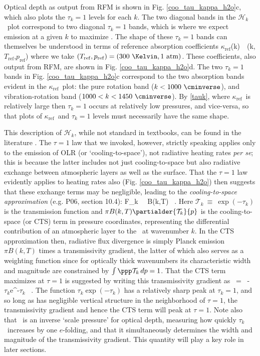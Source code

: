 \documentclass[10pt]{article}
\newcommand{\trans}{\ensuremath{\mathcal{T}}}
\newcommand{\ch}{\ensuremath{\mathcal{H}}}
\newcommand{\chk}{\ensuremath{\ch_k}}
\newcommand{\tauk}{\ensuremath{\tau_k}}
\newcommand{\kapparef}{\ensuremath{\kappa_{\mathrm{ref}}}}
\newcommand{\Tref}{\ensuremath{T_{\mathrm{ref}}}}
\newcommand{\pref}{\ensuremath{p_{\mathrm{ref}}}}
\begin{document}
 Optical depth as output from RFM is shown in Fig. \ref{coo_tau_kappa_h2o}c, which also plots the $\tauk=1$ levels for each $k$. The two diagonal bands in the \chk\ plot correspond to two diagonal $\tauk=1$ bands, which is where we expect emission at a given $k$ to maximize \citep[e.g.][hereafter P06; we discuss the basis for this `$\tau=1$' law below]{petty2006}. The shape of these $\tauk=1$ bands can themselves be understood in terms of reference absorption coefficients 
 \beqn
  \kapparef(k)\ \equiv  \ \kappa(k,\Tref,\pref)
  \eeqn
  where we take $(\Tref,\pref)=(300\ \Kelvin, 1\ \text{atm})$. These coefficients, also output from RFM, are shown in  Fig. \ref{coo_tau_kappa_h2o}d. The two $\tauk=1$ bands  in Fig. \ref{coo_tau_kappa_h2o}c correspond to the two absorption bands evident in the \kapparef\ plot: the pure rotation band ($k < 1000\ \cminverse$), and vibration-rotation band ($1000 < k< 1450 \ \cminverse$). By \eqref{tauk}, where \kapparef\ is relatively large then $\tauk=1$  occurs at relatively low pressures,  and vice-versa, so that plots of \kapparef\ and $\tauk=1$ levels must necessarily have the same shape. 

This description of \chk, while not standard in textbooks, can be found in the literature \citep[e.g.][]{clough1992}. The $\tau=1$ law that we invoked, however, strictly speaking applies only to the emission of OLR (or `cooling-to-space'), not radiative heating rates \emph{per se}; this is because  the latter includes not just cooling-to-space but also radiative exchange between atmospheric layers as well as the surface. That the $\tau=1$ law evidently applies to heating rates also (Fig. \ref{coo_tau_kappa_h2o}) then suggests that these exchange terms may be negligible, leading to the  \emph{cooling-to-space approximation} (e.g. P06, section 10.4):  
\beqn
	\ppp F_k \ \approx \   \pi B(k,T) \partialder{\trans_k}{p} \  .
	\label{cts}
\eeqn
Here $\trans_k \ \equiv \ \exp(-\tauk)$ is the transmission function and $\pi B(k,T) \partialder{\trans_k}{p}$ is the cooling-to-space (or CTS) term in pressure coordinates, representing the differential contribution of an atmospheric layer to the \OLR\ at wavenumber $k$. In the CTS approximation then, radiative flux divergence is  simply Planck emission $\pi B(k,T)$ times a transmissivity gradient, the latter of which also serves as a weighting function since for optically thick wavenumbers its characteristic width and magnitude are constrained by $\int\ppp\trans_k \, dp = 1$. That the CTS term maximizes at $\tau=1$ is suggested by writing this transmissivity gradient as 
 \beqn
 	\partialder{\trans_k}{p} \ = \ -\partialder{\ln \tauk}{p} \tauk e^{-\tauk} \ .
	\label{trans_grad}
\eeqn
 The function $\tauk \exp(-\tauk)$ has a relatively sharp peak at $\tauk=1$, and so long as \partialder{\ln\tauk}{p}  has negligible vertical structure in the neighborhood of $\tau=1$, the transmissivity gradient and hence the CTS term will peak 
at $\tau=1$. Note also that \partialder{\ln\tauk}{p}\ is an inverse  `scale pressure' for optical depth, measuring how quickly \tauk\ increases by one $e$-folding, and that it simultaneously determines the width and magnitude of the transmissivity gradient. This quantity will play a key role in later sections.
\end{document}
